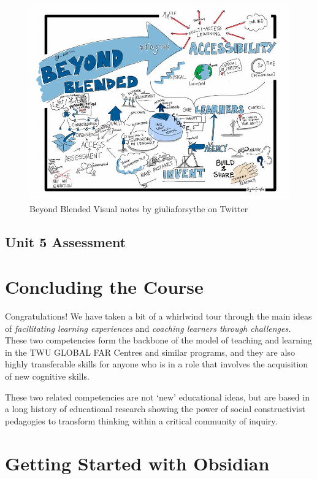 \documentclass[
]{book}
\begin{document}
\begin{figure}
\centering
\includegraphics{assets/U5/U5LAImage.jpg}
\caption{Beyond Blended Visual notes by giuliaforsythe on Twitter}
\end{figure}

\hypertarget{unit-5-assessment}{%
\section*{Unit 5 Assessment}\label{unit-5-assessment}}

\hypertarget{concluding-the-course}{%
\chapter{Concluding the Course}\label{concluding-the-course}}

Congratulations! We have taken a bit of a whirlwind tour through the main ideas of \emph{facilitating learning experiences} and \emph{coaching learners through challenges}. These two competencies form the backbone of the model of teaching and learning in the TWU GLOBAL FAR Centres and similar programs, and they are also highly transferable skills for anyone who is in a role that involves the acquisition of new cognitive skills.

These two related competencies are not `new' educational ideas, but are based in a long history of educational research showing the power of social constructivist pedagogies to transform thinking within a critical community of inquiry.

\hypertarget{getting-started-with-obsidian}{%
\chapter*{Getting Started with Obsidian}\label{getting-started-with-obsidian}}
\end{document}
